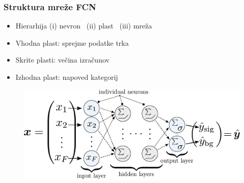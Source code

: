 \documentclass[14pt, t]{beamer}
\begin{document}
\iffalse
\begin{frame}
    \frametitle{Struktura mreže FCN}

    \begin{itemize}
    
        \item<1-> Hierarhija {\small (i) nevron} \ (ii) plast \ {\large (iii) mreža}

        \item<2-> Vhodna plast: sprejme podatke trka
                  
        \item<3-> Skrite plasti: večina izračunov
                  
        \item<4-> Izhodna plast: napoved kategorij
    
    \end{itemize}
    \vspace{-4mm}
    \begin{figure}[htb!]
        \centering
        \includegraphics[width=\linewidth]{vector/fcn-architecture-simple.pdf}
    \end{figure}
\end{frame}
\end{document}
